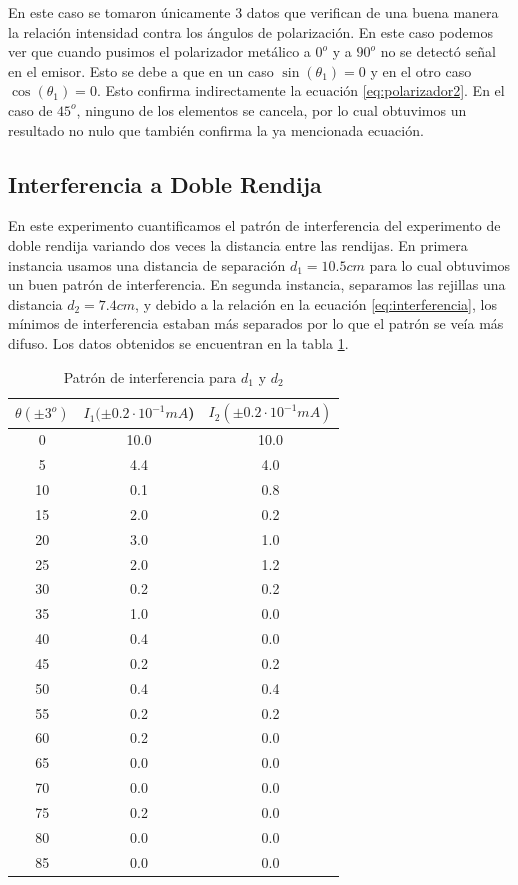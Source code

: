 \documentclass[%
 reprint,
 amsmath,amssymb,
 aps,
]{revtex4-1}
\begin{document}
En este caso se tomaron únicamente 3 datos que verifican de una buena manera la relación intensidad contra los ángulos de polarización. En este caso podemos ver que cuando pusimos el polarizador metálico a $0^o$ y a $90^o$ no se detectó señal en el emisor. Esto se debe a que en un caso $\sin{(\theta_1) }= 0$ y en el otro caso $\cos{(\theta_1)} = 0$. Esto confirma indirectamente la ecuación \ref{eq:polarizador2}. En el caso de $45^o$, ninguno de los elementos se cancela, por lo cual obtuvimos un resultado no nulo que también confirma la ya mencionada ecuación.\\

\subsection{\label{sec:level2}Interferencia a Doble Rendija}
En este experimento cuantificamos el patrón de interferencia del experimento de doble rendija variando dos veces la distancia entre las rendijas. En primera instancia usamos una distancia de separación $d_1= 10.5cm$ para lo cual obtuvimos un buen patrón de interferencia. En segunda instancia, separamos las rejillas una distancia $d_2 = 7.4cm$, y debido a la relación en la ecuación \ref{eq:interferencia}, los mínimos de interferencia estaban más separados por lo que el patrón se veía más difuso.  Los datos obtenidos se encuentran en la tabla \ref{table:inter}.\\


\begin{table}[h!]
\centering
\begin{tabular}{|c|c|c|}
	\hline $ \theta (\pm 3^o) $ & $ I_1(\pm 0.2\cdot 10^{-1}mA  $) &$ I_2(\pm 0.2\cdot 10^{-1}mA)  $  \\ 
	\hline\hline
	0  &  10.0 & 10.0\\
	5  &  4.4 & 4.0\\
	10 &  0.1 & 0.8\\
	15 &  2.0 & 0.2\\
	20 &  3.0 & 1.0\\ 
	25 &  2.0 & 1.2\\ 
	30 &  0.2 & 0.2\\ 
	35 &  1.0 & 0.0\\ 
	40 &  0.4 & 0.0\\ 
	45 &  0.2 & 0.2\\ 
	50 &  0.4 & 0.4\\ 
	55 &  0.2 & 0.2\\ 
	60 &  0.2 & 0.0\\ 
	65 &  0.0 & 0.0\\ 
	70 &  0.0 & 0.0\\ 
	75 &  0.2 & 0.0\\ 
	80 &  0.0 & 0.0\\ 
	85 &  0.0 & 0.0\\ 
	[1ex] 
 \hline
 \end{tabular} 
  \caption{Patrón de interferencia para $d_1$ y $d_2$}
\label{table:inter} 
\end{table}
\end{document}
